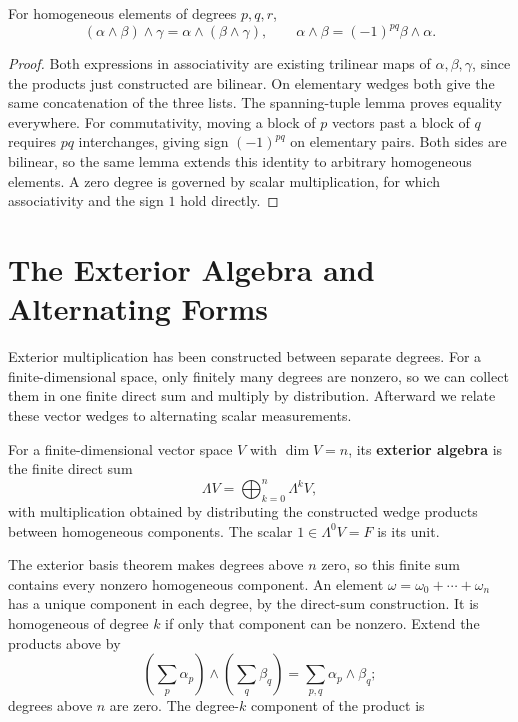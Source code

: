 \begin{proposition}
For homogeneous elements of degrees $p,q,r$,
\[
(\alpha\wedge\beta)\wedge\gamma=\alpha\wedge(\beta\wedge\gamma),
\qquad \alpha\wedge\beta=(-1)^{pq}\beta\wedge\alpha.
\]
\end{proposition}
\begin{proof}
Both expressions in associativity are existing trilinear maps of
$\alpha,\beta,\gamma$, since the products just constructed are bilinear.
On elementary wedges both give the same concatenation of the three lists.
The spanning-tuple lemma proves equality everywhere. For commutativity,
moving a block of $p$ vectors past a block of $q$ requires $pq$
interchanges, giving sign $(-1)^{pq}$ on elementary pairs. Both sides are
bilinear, so the same lemma extends this identity to arbitrary homogeneous
elements. A zero degree is governed by scalar multiplication, for which
associativity and the sign $1$ hold directly.
\end{proof}

\section{The Exterior Algebra and Alternating Forms}

Exterior multiplication has been constructed between separate degrees.
For a finite-dimensional space, only finitely many degrees are nonzero,
so we can collect them in one finite direct sum and multiply by distribution.
Afterward we relate these vector wedges to alternating scalar measurements.
\label{sec:appendix-exterior-algebra}
\begin{definition}\label{def:appendix-exterior-algebra}
For a finite-dimensional vector space $V$ with $\dim V=n$, its
\textbf{exterior algebra} is the finite direct sum
\[
\Lambda V=\bigoplus_{k=0}^n\Lambda^kV,
\]
with multiplication obtained by distributing the constructed wedge products
between homogeneous components. The scalar $1\in\Lambda^0V=F$ is its unit.
\end{definition}
The exterior basis theorem makes degrees above $n$ zero, so this finite
sum contains every nonzero homogeneous component.
An element $\omega=\omega_0+\cdots+\omega_n$ has a unique component in
each degree, by the direct-sum construction. It is homogeneous of degree
$k$ if only that component can be nonzero. Extend the products above by
\[
\left(\sum_p\alpha_p\right)\wedge\left(\sum_q\beta_q\right)
=\sum_{p,q}\alpha_p\wedge\beta_q;
\]
degrees above $n$ are zero. The degree-$k$ component of the product is

